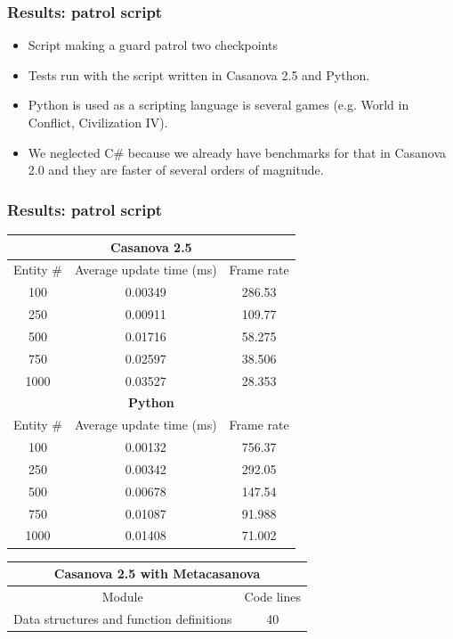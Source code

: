 \documentclass[10pt,a4paper]{beamer}
\begin{document}
\begin{frame}
	\frametitle{Results: patrol script}
	\begin{itemize}
		\item Script making a guard patrol two checkpoints
		\item Tests run with the script written in Casanova 2.5 and Python.
		\item Python is used as a scripting language is several games (e.g. World in Conflict, Civilization IV).
		\item We neglected C\# because we already have benchmarks for that in Casanova 2.0 and they are faster of several orders of magnitude.
	\end{itemize}
\end{frame}

\begin{frame}
	\frametitle{Results: patrol script}
	\begin{table}
		\centering
		\tiny	
		\begin{tabular}{|c|c|c|}
			\hline
			\multicolumn{3}{|c|}{\textbf{Casanova 2.5}} \\
			\hline
			Entity \# & Average update time (ms) & Frame rate \\
			\hline
			100 & 0.00349 & 286.53 \\
			\hline
			250 & 0.00911 & 109.77 \\
			\hline
			500 & 0.01716 & 58.275 \\
			\hline
			750 & 0.02597 & 38.506 \\
			\hline
			1000 & 0.03527 & 28.353 \\
			\hline
			\multicolumn{3}{|c|}{\textbf{Python}} \\
			\hline
			Entity \# & Average update time (ms) & Frame rate \\
			\hline
			100 & 0.00132 & 756.37 \\
			\hline
			250 & 0.00342 & 292.05 \\
			\hline
			500 & 0.00678 & 147.54 \\
			\hline
			750 & 0.01087 & 91.988 \\
			\hline
			1000 & 0.01408 & 71.002 \\
			\hline
		\end{tabular}
		\quad
		\begin{tabular}{|c|c|}
			\hline
			\multicolumn{2}{|c|}{\textbf{Casanova 2.5 with Metacasanova}} \\
			\hline
			Module & Code lines \\
			\hline
			Data structures and function definitions & 40 \\

\end{tabular}
\end{table}
\end{frame}
\end{document}
